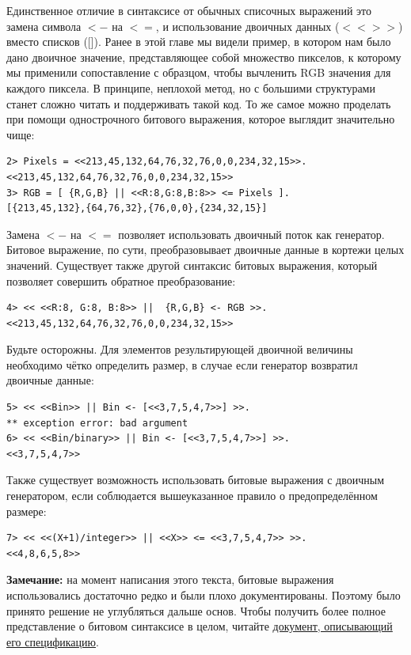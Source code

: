 \documentclass[a4paper,12pt]{report}
\newcommand{\ops}{\colorbox{lgreen}}
\begin{document}
Единственное отличие в синтаксисе от обычных списочных выражений это замена символа \ops{$<-$} на \ops{$<=$}, и использование двоичных данных ($<< >>$) вместо списков ([]). Ранее в этой главе мы видели пример, в котором нам было дано двоичное значение, представляющее собой множество пикселов, к которому мы применили сопоставление с образцом, чтобы вычленить RGB значения для каждого пиксела. В принципе, неплохой метод, но с большими структурами станет сложно читать и поддерживать такой код. То же самое можно проделать при помощи однострочного битового выражения, которое выглядит значительно чище:
\begin{lstlisting}[style=repl]
2> Pixels = <<213,45,132,64,76,32,76,0,0,234,32,15>>.
<<213,45,132,64,76,32,76,0,0,234,32,15>>
3> RGB = [ {R,G,B} || <<R:8,G:8,B:8>> <= Pixels ].
[{213,45,132},{64,76,32},{76,0,0},{234,32,15}]
\end{lstlisting}

Замена \ops{$<-$} на \ops{$<=$} позволяет использовать двоичный поток как генератор. Битовое выражение, по сути, преобразовывает двоичные данные в кортежи целых значений. Существует также другой синтаксис битовых выражения, который позволяет совершить обратное преобразование:
\begin{lstlisting}[style=repl]
4> << <<R:8, G:8, B:8>> ||  {R,G,B} <- RGB >>.
<<213,45,132,64,76,32,76,0,0,234,32,15>>
\end{lstlisting}

Будьте осторожны. Для элементов результирующей двоичной величины необходимо чётко определить размер, в случае если генератор возвратил двоичные данные:
\begin{lstlisting}[style=repl]
5> << <<Bin>> || Bin <- [<<3,7,5,4,7>>] >>.
** exception error: bad argument
6> << <<Bin/binary>> || Bin <- [<<3,7,5,4,7>>] >>. 
<<3,7,5,4,7>>
\end{lstlisting}

Также существует возможность использовать битовые выражения с двоичным генератором, если соблюдается вышеуказанное правило о предопределённом размере:
\begin{lstlisting}[style=repl]
7> << <<(X+1)/integer>> || <<X>> <= <<3,7,5,4,7>> >>.
<<4,8,6,5,8>>
\end{lstlisting}
\colorbox{lgray}
{
    \begin{minipage}{\linewidth}
        \textbf{Замечание:} на момент написания этого текста, битовые выражения использовались достаточно редко и были плохо документированы. Поэтому было принято решение не углубляться дальше основ. Чтобы получить более полное представление о битовом синтаксисе в целом, читайте \href{http://user.it.uu.se/~pergu/papers/erlang05.pdf}{документ, описывающий его спецификацию}.
    \end{minipage}
}
\end{document}
